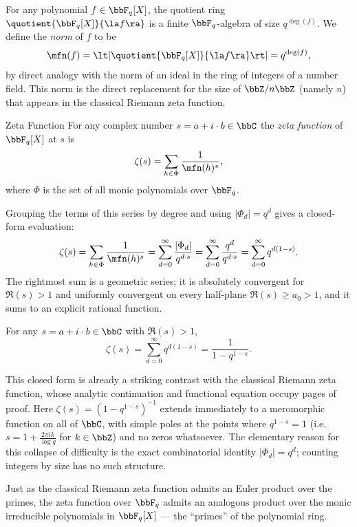 For any polynomial $f\in\bbF_q[X]$, the quotient ring $\quotient{\bbF_q[X]}{\la f\ra}$ is a finite $\bbF_q$-algebra of size $q^{\deg(f)}$. We define the \emph{norm} of $f$ to be
$$\mfn(f)=\lt|\quotient{\bbF_q[X]}{\la f\ra}\rt|=q^{\deg(f)},$$
by direct analogy with the norm of an ideal in the ring of integers of a number field. This norm is the direct replacement for the size of $\bbZ/n\bbZ$ (namely $n$) that appears in the classical Riemann zeta function.

\begin{Definition}{Zeta Function}{}
  For any complex number $s=a+i\cdot b\in\bbC$ the \emph{zeta function} of $\bbF_q[X]$ at $s$ is
  $$\zeta(s)=\sum_{h\in\Phi}\frac{1}{\mfn(h)^s},$$
  where $\Phi$ is the set of all monic polynomials over $\bbF_q$.
\end{Definition}

Grouping the terms of this series by degree and using $|\Phi_d|=q^d$ gives a closed-form evaluation:
$$\zeta(s)=\sum_{h\in\Phi}\frac{1}{\mfn(h)^s}=\sum_{d=0}^{\infty}\frac{|\Phi_d|}{q^{d\cdot s}}=\sum_{d=0}^{\infty}\frac{q^d}{q^{d\cdot s}}=\sum_{d=0}^{\infty}q^{d(1-s)}.$$
The rightmost sum is a geometric series; it is absolutely convergent for $\Re(s)>1$ and uniformly convergent on every half-plane $\Re(s)\geq a_0>1$, and it sums to an explicit rational function.

\begin{observation}
  For any $s=a+i\cdot b\in\bbC$ with $\Re(s)>1$,
  $$\zeta(s)=\sum_{d=0}^{\infty}q^{d(1-s)}=\frac{1}{1-q^{1-s}}.$$
\end{observation}

This closed form is already a striking contrast with the classical Riemann zeta function, whose analytic continuation and functional equation occupy pages of proof. Here $\zeta(s)=(1-q^{1-s})^{-1}$ extends immediately to a meromorphic function on all of $\bbC$, with simple poles at the points where $q^{1-s}=1$ (i.e.\ $s=1+\frac{2\pi i k}{\log q}$ for $k\in\bbZ$) and no zeros whatsoever. The elementary reason for this collapse of difficulty is the exact combinatorial identity $|\Phi_d|=q^d$; counting integers by size has no such structure.

Just as the classical Riemann zeta function admits an Euler product over the primes, the zeta function over $\bbF_q$ admits an analogous product over the monic irreducible polynomials in $\bbF_q[X]$ --- the ``primes'' of the polynomial ring.

